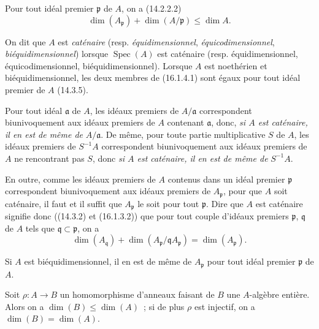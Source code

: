 \begin{env}[16.1.4]
\label{0.16.1.4-fr}
Pour tout idéal premier $\mathfrak{p}$ de $A$, on a (14.2.2.2)
\[
\label{0.16.1.4.1-fr}
  \dim(A_{\mathfrak{p}})+\dim(A/\mathfrak{p})\leq\dim A.
\tag{16.1.4.1}
\]

On dit que $A$ est \emph{caténaire} (resp. \emph{équidimensionnel}, \emph{équicodimensionnel},
\emph{biéquidimensionnel}) lorsque $\operatorname{Spec}(A)$ est caténaire (resp.
équidimensionnel,
équicodimensionnel, biéquidimensionnel). Lorsque $A$ est noethérien et
biéquidimensionnel, les deux membres de (16.1.4.1) sont égaux pour tout idéal
premier de $A$ (14.3.5).

Pour tout idéal $\mathfrak{a}$ de $A$, les idéaux premiers de
$A/\mathfrak{a}$ correspondent biunivoquement aux idéaux premiers de $A$
contenant $\mathfrak{a}$, donc, \emph{si $A$ est caténaire, il en est de même de}
$A/\mathfrak{a}$. De même, pour toute partie multiplicative $S$ de $A$, les
idéaux premiers de $S^{-1}A$ correspondent biunivoquement aux idéaux premiers
de $A$ ne rencontrant pas $S$, donc \emph{si $A$ est caténaire, il en est de même de}
$S^{-1}A$.

En outre, comme les idéaux premiers de $A$ contenus dans un idéal premier
$\mathfrak{p}$ correspondent biunivoquement aux idéaux premiers de
$A_{\mathfrak{p}}$, pour que $A$ soit caténaire, il faut et il suffit que
$A_{\mathfrak{p}}$ le soit pour tout $\mathfrak{p}$. Dire que $A$ est
caténaire signifie donc ((14.3.2) et (16.1.3.2)) que pour tout couple d'idéaux
premiers $\mathfrak{p}$, $\mathfrak{q}$ de $A$ tels que
$\mathfrak{q}\subset\mathfrak{p}$, on a
\[
\label{0.16.1.4.2-fr}
  \dim(A_{\mathfrak{q}})
  +\dim(A_{\mathfrak{p}}/\mathfrak{q}A_{\mathfrak{p}})
  =\dim(A_{\mathfrak{p}}).
\tag{16.1.4.2}
\]

Si $A$ est biéquidimensionnel, il en est de même de $A_{\mathfrak{p}}$ pour
tout idéal premier $\mathfrak{p}$ de $A$.
\end{env}

\begin{proposition}[16.1.5]
\label{0.16.1.5-fr}
Soit $\rho:A\to B$ un homomorphisme d'anneaux faisant de $B$ une $A$-algèbre
entière. Alors on a $\dim(B)\leq\dim(A)$~; si de plus $\rho$ est injectif, on a
$\dim(B)=\dim(A)$.
\end{proposition}

